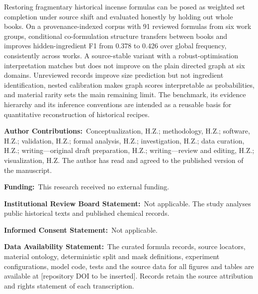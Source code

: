 \documentclass[10pt,a4paper]{article}
\makeatletter
\renewcommand{\section}{\@startsection{section}{1}{0pt}{12pt plus 2pt}{6pt}{\normalfont\normalsize\bfseries}}
\newcommand{\backmatterhead}[1]{\par\vspace{4pt}\noindent\textbf{#1}\ }
\newcommand{\authorcontributions}[1]{{\small\backmatterhead{Author Contributions:}#1\par}}
\newcommand{\funding}[1]{{\small\backmatterhead{Funding:}#1\par}}
\newcommand{\institutionalreview}[1]{{\small\backmatterhead{Institutional Review Board Statement:}#1\par}}
\newcommand{\informedconsent}[1]{{\small\backmatterhead{Informed Consent Statement:}#1\par}}
\newcommand{\dataavailability}[1]{{\small\backmatterhead{Data Availability Statement:}#1\par}}
\makeatother
\begin{document}
\section{Conclusions}
\label{sec:conclusions}

Restoring fragmentary historical incense formulas can be posed as weighted set completion under source shift and evaluated honestly by holding out whole books. On a provenance-indexed corpus with 91 reviewed formulas from six work groups, conditional co-formulation structure transfers between books and improves hidden-ingredient F1 from 0.378 to 0.426 over global frequency, consistently across works. A source-stable variant with a robust-optimisation interpretation matches but does not improve on the plain directed graph at six domains. Unreviewed records improve size prediction but not ingredient identification, nested calibration makes graph scores interpretable as probabilities, and material rarity sets the main remaining limit. The benchmark, its evidence hierarchy and its inference conventions are intended as a reusable basis for quantitative reconstruction of historical recipes.

\vspace{6pt}

\authorcontributions{Conceptualization, H.Z.; methodology, H.Z.; software, H.Z.; validation, H.Z.; formal analysis, H.Z.; investigation, H.Z.; data curation, H.Z.; writing---original draft preparation, H.Z.; writing---review and editing, H.Z.; visualization, H.Z. The author has read and agreed to the published version of the manuscript.}

\funding{This research received no external funding.}

\institutionalreview{Not applicable. The study analyses public historical texts and published chemical records.}

\informedconsent{Not applicable.}

\dataavailability{The curated formula records, source locators, material ontology, deterministic split and mask definitions, experiment configurations, model code, tests and the source data for all figures and tables are available at [repository DOI to be inserted]. Records retain the source attribution and rights statement of each transcription.}
\end{document}

